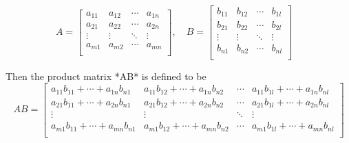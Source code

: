 
\[
A = 
\begin{bmatrix} 
a_{11} & a_{12} & \cdots &  a_{1n} \\
a_{21} & a_{22} & \cdots &  a_{2n}\\
\vdots & \vdots & \ddots & \vdots \\
a_{m1} & a_{m2} & \cdots &  a_{mn} \\
\end{bmatrix} 
,
\quad
B = 
\begin{bmatrix} 
b_{11} & b_{12} & \cdots &  b_{1l} \\
b_{21} & b_{22} & \cdots &  b_{2l}\\
\vdots & \vdots & \ddots & \vdots \\
b_{n1} & b_{n2} & \cdots &  b_{nl} \\
\end{bmatrix}
\quad
\]

Then the product matrix *AB* is defined to be
\[
AB = 
\begin{bmatrix} 
a_{11}b_{11} +\cdots + a_{1n}b_{n1} & a_{11}b_{12} +\cdots + a_{1n}b_{n2} & \cdots & a_{11}b_{1l} +\cdots + a_{1n}b_{nl} \\
 a_{21}b_{11} +\cdots + a_{2n}b_{n1} & a_{21}b_{12} +\cdots + a_{2n}b_{n2} & \cdots & a_{21}b_{1l} +\cdots + a_{2n}b_{nl} \\
\vdots & \vdots & \ddots & \vdots \\
 a_{m1}b_{11} +\cdots + a_{mn}b_{n1} & a_{m1}b_{12} +\cdots + a_{mn}b_{n2} & \cdots & a_{m1}b_{1l} +\cdots + a_{mn}b_{nl} \\
\end{bmatrix} 
\]
